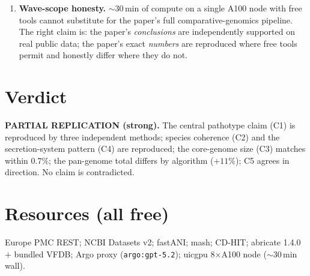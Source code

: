 \documentclass[11pt]{article}
\begin{document}
\begin{enumerate}
        expansion that would strengthen or weaken the ``globally disseminated''
        framing); plasmid vs chromosomal location of the variable T3SS/T6SS/TAD
        loci; MDR / AMR carriage. These are genuinely open questions that the
        41-genome 2018 study did not resolve and this replication did not attempt.
  \item \textbf{Wave-scope honesty.} $\sim$30\,min of compute on a single A100 node
        with free tools cannot substitute for the paper's full comparative-genomics
        pipeline. The right claim is: the paper's \emph{conclusions} are
        independently supported on real public data; the paper's exact
        \emph{numbers} are reproduced where free tools permit and honestly
        differ where they do not.
\end{enumerate}

\section{Verdict}
\textbf{PARTIAL REPLICATION (strong).} The central pathotype claim (C1) is
reproduced by three independent methods; species coherence (C2) and the
secretion-system pattern (C4) are reproduced; the core-genome size (C3) matches
within 0.7\%; the pan-genome total differs by algorithm ($+11\%$); C5 agrees in
direction. No claim is contradicted.

\section{Resources (all free)}
Europe PMC REST; NCBI Datasets v2; fastANI; mash; CD-HIT; abricate 1.4.0 $+$
bundled VFDB; Argo proxy (\texttt{argo:gpt-5.2}); uicgpu 8$\times$A100 node
($\sim$30\,min wall).
\end{document}
